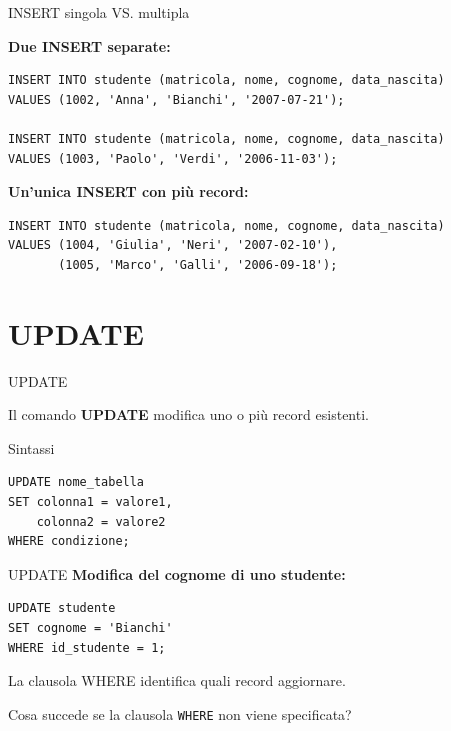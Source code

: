 \documentclass{beamer}
\begin{document}
\begin{frame}[fragile]{INSERT singola VS. multipla}
\small

\medskip
\textbf{Due INSERT separate:}

\begin{verbatim}
INSERT INTO studente (matricola, nome, cognome, data_nascita)
VALUES (1002, 'Anna', 'Bianchi', '2007-07-21');

INSERT INTO studente (matricola, nome, cognome, data_nascita)
VALUES (1003, 'Paolo', 'Verdi', '2006-11-03');
\end{verbatim}

\medskip
\textbf{Un'unica INSERT con più record:}

\begin{verbatim}
INSERT INTO studente (matricola, nome, cognome, data_nascita)
VALUES (1004, 'Giulia', 'Neri', '2007-02-10'),
       (1005, 'Marco', 'Galli', '2006-09-18');
\end{verbatim}

\end{frame}

\section{UPDATE}


\begin{frame}[fragile]{UPDATE}

Il comando \textbf{UPDATE} modifica uno o più record esistenti.
\begin{block}{Sintassi}
\begin{verbatim}
UPDATE nome_tabella
SET colonna1 = valore1,
    colonna2 = valore2
WHERE condizione;
\end{verbatim}
\end{block}
\end{frame}

\begin{frame}[fragile]{UPDATE}
\small
\textbf{Modifica del cognome di uno studente:}

\begin{verbatim}
UPDATE studente
SET cognome = 'Bianchi'
WHERE id_studente = 1;
\end{verbatim}

\medskip
La clausola WHERE identifica quali record aggiornare.

\medskip
\alert{Cosa succede se la clausola \texttt{WHERE} non viene specificata?}
\end{frame}
\end{document}
